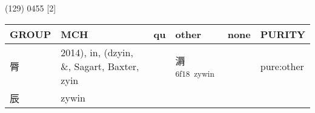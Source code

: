 \documentclass[14pt,a4paper]{scrartcl}
\begin{document}
(129) 0455 {[}2{]}

\begin{longtable}[c]{@{}llllll@{}}
\toprule
\begin{minipage}[b]{0.14\columnwidth}\raggedright\strut
GROUP
\strut\end{minipage} &
\begin{minipage}[b]{0.14\columnwidth}\raggedright\strut
MCH
\strut\end{minipage} &
\begin{minipage}[b]{0.14\columnwidth}\raggedright\strut
qu
\strut\end{minipage} &
\begin{minipage}[b]{0.14\columnwidth}\raggedright\strut
other
\strut\end{minipage} &
\begin{minipage}[b]{0.14\columnwidth}\raggedright\strut
none
\strut\end{minipage} &
\begin{minipage}[b]{0.14\columnwidth}\raggedright\strut
PURITY
\strut\end{minipage}\tabularnewline
\midrule
\endhead
\begin{minipage}[t]{0.14\columnwidth}\raggedright\strut
脣
\strut\end{minipage} &
\begin{minipage}[t]{0.14\columnwidth}\raggedright\strut
2014), in, (dzyin, \&, Sagart, Baxter, zyin
\strut\end{minipage} &
\begin{minipage}[t]{0.14\columnwidth}\raggedright\strut
\strut\end{minipage} &
\begin{minipage}[t]{0.14\columnwidth}\raggedright\strut
漘\textsuperscript{6f18~zywin}
\strut\end{minipage} &
\begin{minipage}[t]{0.14\columnwidth}\raggedright\strut
\strut\end{minipage} &
\begin{minipage}[t]{0.14\columnwidth}\raggedright\strut
pure:other
\strut\end{minipage}\tabularnewline
\begin{minipage}[t]{0.14\columnwidth}\raggedright\strut
辰
\strut\end{minipage} &
\begin{minipage}[t]{0.14\columnwidth}\raggedright\strut
zywin
\strut\end{minipage} &
\begin{minipage}[t]{0.14\columnwidth}\raggedright\strut

\end{minipage}
\end{longtable}
\end{document}
